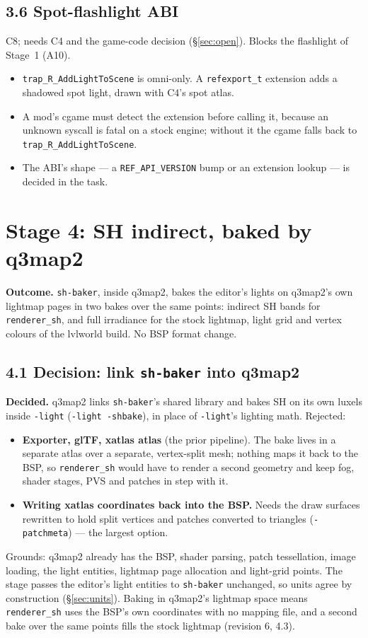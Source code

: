 \documentclass[11pt,a4paper]{article}
\begin{document}
\subsection{3.6 Spot-flashlight ABI}
C8; needs C4 and the game-code decision (§\ref{sec:open}). Blocks the flashlight of Stage~1 (A10).
\begin{itemize}
\item \texttt{trap\_R\_AddLightToScene} is omni-only. A \texttt{refexport\_t} extension adds a
  shadowed spot light, drawn with C4's spot atlas.
\item A mod's cgame must detect the extension before calling it, because an unknown syscall is
  fatal on a stock engine; without it the cgame falls back to \texttt{trap\_R\_AddLightToScene}.
\item The ABI's shape --- a \texttt{REF\_API\_VERSION} bump or an extension lookup --- is decided
  in the task.
\end{itemize}

\section{Stage 4: SH indirect, baked by q3map2}

\textbf{Outcome.} \texttt{sh-baker}, inside q3map2, bakes the editor's lights on q3map2's own
lightmap pages in two bakes over the same points: indirect SH bands for \texttt{renderer\_sh}, and
full irradiance for the stock lightmap, light grid and vertex colours of the lvlworld build. No BSP
format change.

\subsection{4.1 Decision: link \texttt{sh-baker} into q3map2}

\textbf{Decided.} q3map2 links \texttt{sh-baker}'s shared library and bakes SH on its own luxels
inside \texttt{-light} (\texttt{-light -shbake}), in place of \texttt{-light}'s lighting math. Rejected:
\begin{itemize}
\item \textbf{Exporter, glTF, xatlas atlas} (the prior pipeline). The bake lives in a separate
  atlas over a separate, vertex-split mesh; nothing maps it back to the BSP, so
  \texttt{renderer\_sh} would have to render a second geometry and keep fog, shader stages, PVS
  and patches in step with it.
\item \textbf{Writing xatlas coordinates back into the BSP.} Needs the draw surfaces rewritten to
  hold split vertices and patches converted to triangles (\texttt{-patchmeta}) --- the largest
  option.
\end{itemize}
Grounds: q3map2 already has the BSP, shader parsing, patch tessellation, image loading, the light
entities, lightmap page allocation and light-grid points. The stage passes the editor's light
entities to \texttt{sh-baker} unchanged, so units agree by construction (§\ref{sec:units}). Baking
in q3map2's lightmap space means \texttt{renderer\_sh} uses the BSP's own coordinates with no
mapping file, and a second bake over the same points fills the stock lightmap (revision 6, 4.3).
\end{document}

